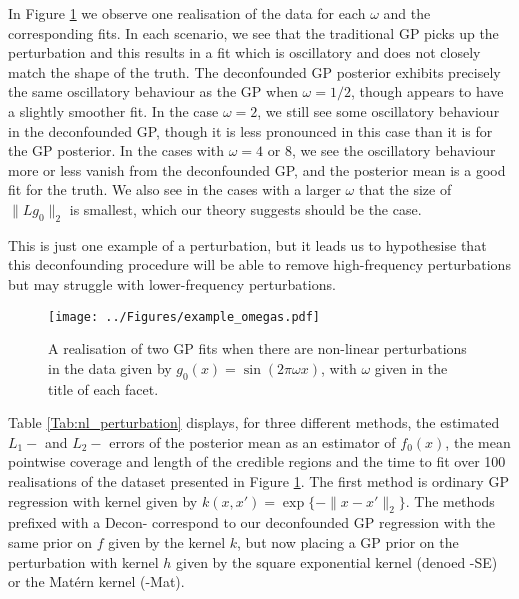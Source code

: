 \documentclass[11pt]{article}
\numberwithin{equation}{section}
\begin{document}
In Figure \ref{fig:gp_non_linear_pert} we observe one realisation of the data for each $\omega$ and the corresponding fits. In each scenario, we see that the traditional GP picks up the perturbation and this results in a fit which is oscillatory and does not closely match the shape of the truth. The deconfounded GP posterior exhibits precisely the same oscillatory behaviour as the GP when $\omega = 1/2$, though appears to have a slightly smoother fit. In the case $\omega = 2$, we still see some oscillatory behaviour in the deconfounded GP, though it is less pronounced in this case than it is for the GP posterior. In the cases with $\omega = 4$ or $8$, we see the oscillatory behaviour more or less vanish from the deconfounded GP, and the posterior mean is a good fit for the truth. We also see in the cases with a larger $\omega$ that the size of $\|L g_0\|_2$ is smallest, which our theory suggests should be the case.

This is just one example of a perturbation, but it leads us to hypothesise that this deconfounding procedure will be able to remove high-frequency perturbations but may struggle with lower-frequency perturbations.

\begin{figure}[!h]
\centering
  \texttt{[image: ../Figures/example\_omegas.pdf]}
  \caption{A realisation of two GP fits when there are  non-linear perturbations in the data given by $g_0(x) = \sin(2\pi\omega x)$, with $\omega$ given in the title of each facet.}
\label{fig:gp_non_linear_pert}
\end{figure}

Table \ref{Tab:nl_perturbation} displays, for three different methods, the estimated $L_1-$ and $L_2-$ errors of the posterior mean as an estimator of $f_0(x)$, the mean pointwise coverage and length of the credible regions and the time to fit over 100 realisations of the dataset presented in Figure \ref{fig:gp_non_linear_pert}. The first method is ordinary GP regression with kernel given by $k(x, x') =\exp\{-\|x-x'\|_2\}$. The methods prefixed with a Decon- correspond to our deconfounded GP regression with the same prior on $f$ given by the kernel $k$, but now placing a GP prior on the perturbation with kernel $h$ given by the square exponential kernel (denoed -SE) or the Mat\'ern kernel (-Mat).
\end{document}
